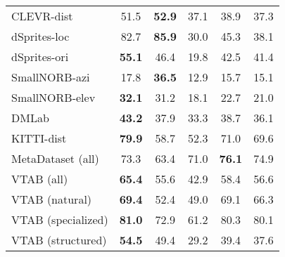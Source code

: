 \documentclass{article}
\begin{document}
\begin{table}[H]
\begin{center}
\begin{tabular}{lccccc}
CLEVR-dist & 51.5 & \textbf{52.9} & 37.1 & 38.9 & 37.3\\
dSprites-loc & 82.7 & \textbf{85.9} & 30.0 & 45.3 & 38.1\\
dSprites-ori & \textbf{55.1} & 46.4 & 19.8 & 42.5 & 41.4\\
SmallNORB-azi & 17.8 & \textbf{36.5} & 12.9 & 15.7 & 15.1\\
SmallNORB-elev & \textbf{32.1} & 31.2 & 18.1 & 22.7 & 21.0\\
DMLab & \textbf{43.2} & 37.9 & 33.3 & 38.7 & 36.1\\
KITTI-dist & \textbf{79.9} & 58.7 & 52.3 & 71.0 & 69.6\\
\midrule
MetaDataset (all) & 73.3 & 63.4 & 71.0 & \textbf{76.1} & 74.9\\
VTAB (all) & \textbf{65.4} & 55.6 & 42.9 & 58.4 & 56.6\\
VTAB (natural) & \textbf{69.4} & 52.4 & 49.0 & 69.1 & 66.3\\
VTAB (specialized) & \textbf{81.0} & 72.9 & 61.2 & 80.3 & 80.1\\
VTAB (structured) & \textbf{54.5} & 49.4 & 29.2 & 39.4 & 37.6\\
\bottomrule
\end{tabular}
\label{tab:breakdown_uppercase_vs_finetuning}
\end{center}
\vskip -0.1in
\end{table}
\end{document}
